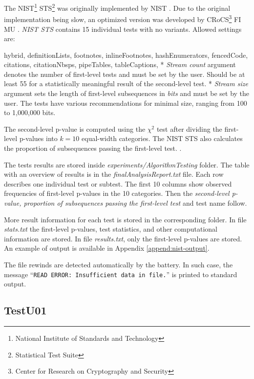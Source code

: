 \documentclass[
  digital,     %
  oneside,     %
  nosansbold,  %
  nocolorbold, %
  nolof,         %
  nolot,         %
]{fithesis4}
\begin{document}
The NIST\footnote{National Institute of Standards and Technology} STS\footnote{Statistical Test Suite} \cite{nist_special} was originally implemented by NIST \cite{nist_site}. Due to the original implementation being slow, an optimized version \cite{nist-opt} was developed by CRoCS\footnote{Center for Research on Cryptography and Security} FI MU \cite{nist_faster}. \emph{NIST STS} contains 15 individual tests with no variants. Allowed settings are:
\begin{markdown*}{%
  hybrid,
  definitionLists,
  footnotes,
  inlineFootnotes,
  hashEnumerators,
  fencedCode,
  citations,
  citationNbsps,
  pipeTables,
  tableCaptions,
}
* \emph{Stream count} argument denotes the number of first-level tests and must be set by the user. Should be at least 55 for a statistically meaningful result of the second-level test. 
* \emph{Stream size} argument sets the length of first-level subsequences in \emph{bits} and must be set by the user. The tests have various recommendations for minimal size, ranging from 100 to 1,000,000 bits.
\end{markdown*}

The second-level p-value is computed using the $\chi^2$ test after dividing the first-level p-values into $k=10$ equal-width categories. The NIST STS also calculates the proportion of subsequences passing the first-level test. \cite[p. 4-1]{nist_special}.

The tests results are stored inside \emph{experiments/AlgorithmTesting} folder. The table with an overview of results is in the \emph{finalAnalysisReport.txt} file. Each row describes one individual test or subtest. The first 10 columns show observed frequencies of first-level p-values in the 10 categories. Then the \emph{second-level p-value, proportion of subsequences passing the first-level test} and test name follow. 

More result information for each test is stored in the corresponding folder. In file \emph{stats.txt} the first-level p-values, test statistics, and other computational information are stored. In file \emph{results.txt}, only the first-level p-values are stored. An example of output is available in Appendix \ref{append:nist-output}.

The file rewinds are detected automatically by the battery. In such case, the message ``\texttt{READ ERROR:  Insufficient data in file.}'' is printed to standard output.


\subsection{TestU01} \label{chap:sols-testu01}
\end{document}
